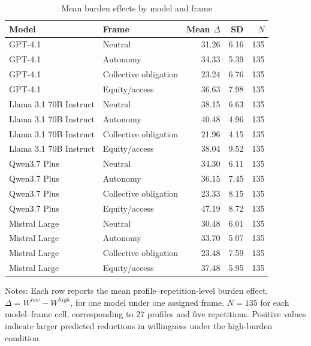 \begin{table}[htbp]
\centering
\caption{Mean burden effects by model and frame}
\label{tab:h3_model_frame_means}
\begin{tabular}{llrrr}
\toprule
Model & Frame & Mean \(\Delta\) & SD & \(N\) \\
\midrule
GPT-4.1 & Neutral & 31.26 & 6.16 & 135 \\
GPT-4.1 & Autonomy & 34.33 & 5.39 & 135 \\
GPT-4.1 & Collective obligation & 23.24 & 6.76 & 135 \\
GPT-4.1 & Equity/access & 36.63 & 7.98 & 135 \\
Llama 3.1 70B Instruct & Neutral & 38.15 & 6.63 & 135 \\
Llama 3.1 70B Instruct & Autonomy & 40.48 & 4.96 & 135 \\
Llama 3.1 70B Instruct & Collective obligation & 21.96 & 4.15 & 135 \\
Llama 3.1 70B Instruct & Equity/access & 38.04 & 9.52 & 135 \\
Qwen3.7 Plus & Neutral & 34.30 & 6.11 & 135 \\
Qwen3.7 Plus & Autonomy & 36.15 & 7.45 & 135 \\
Qwen3.7 Plus & Collective obligation & 23.33 & 8.15 & 135 \\
Qwen3.7 Plus & Equity/access & 47.19 & 8.72 & 135 \\
Mistral Large & Neutral & 30.48 & 6.01 & 135 \\
Mistral Large & Autonomy & 33.70 & 5.07 & 135 \\
Mistral Large & Collective obligation & 23.48 & 7.59 & 135 \\
Mistral Large & Equity/access & 37.48 & 5.95 & 135 \\
\bottomrule
\end{tabular}
\begin{flushleft}
\footnotesize Notes: Each row reports the mean profile--repetition-level burden effect, \(\Delta = W^{low}-W^{high}\), for one model under one assigned frame. \(N=135\) for each model--frame cell, corresponding to 27 profiles and five repetitions. Positive values indicate larger predicted reductions in willingness under the high-burden condition.
\end{flushleft}
\end{table}

